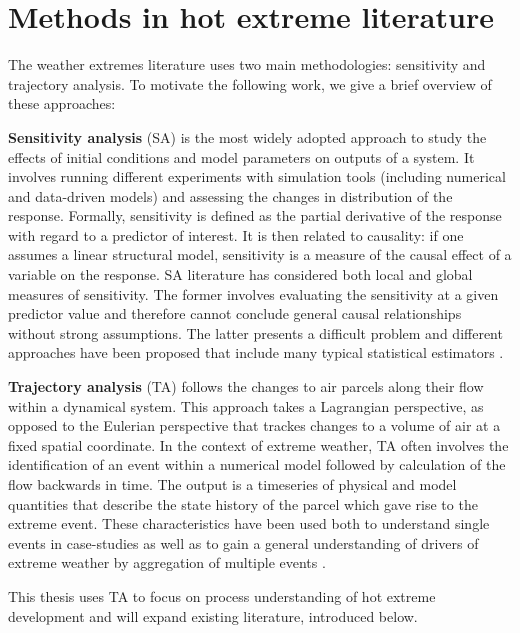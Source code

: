 \documentclass[11pt,a4paper,twoside,openright]{report}
\theoremstyle{definition}
\begin{document}
\section{Methods in hot extreme literature}\label{methods-in-hot-extreme-literature}

The weather extremes literature uses two main methodologies: sensitivity and trajectory analysis. To motivate the following work, we give a brief overview of these approaches:

\textbf{Sensitivity analysis} (SA) is the most widely adopted approach to study the effects of initial conditions and model parameters on outputs of a system. It involves running different experiments with simulation tools (including numerical and data-driven models) and assessing the changes in distribution of the response. Formally, sensitivity is defined as the partial derivative of the response with regard to a predictor of interest. It is then related to causality: if one assumes a linear structural model, sensitivity is a measure of the causal effect of a variable on the response. SA literature has considered both local and global measures of sensitivity. The former involves evaluating the sensitivity at a given predictor value and therefore cannot conclude general causal relationships without strong assumptions. The latter presents a difficult problem and different approaches have been proposed that include many typical statistical estimators \citep{razavi_what_2015}.

\textbf{Trajectory analysis} (TA) follows the changes to air parcels along their flow within a dynamical system. This approach takes a Lagrangian perspective, as opposed to the Eulerian perspective that trackes changes to a volume of air at a fixed spatial coordinate. In the context of extreme weather, TA often involves the identification of an event within a numerical model followed by calculation of the flow backwards in time. The output is a timeseries of physical and model quantities that describe the state history of the parcel which gave rise to the extreme event. These characteristics have been used both to understand single events in case-studies \citep[e.g.][]{stohl_lagrangian_2004,huang_moisture_2015,papritz_novel_2023} as well as to gain a general understanding of drivers of extreme weather by aggregation of multiple events \citep[e.g.][]{bieli_lagrangian_2015,quinting_southeastern_2017,rothlisberger_quantifying_2023}.

This thesis uses TA to focus on process understanding of hot extreme development and will expand existing literature, introduced below.
\end{document}
